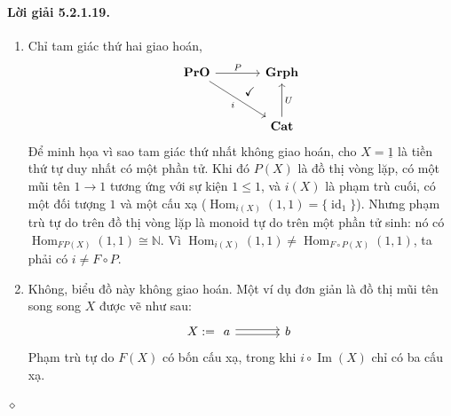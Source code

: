 \paragraph{Lời giải 5.2.1.19.}
\begin{enumerate}[label=\alph*.]
\item Chỉ tam giác thứ hai giao hoán,
\[\begin{tikzcd}[column sep=large,row sep=large]
\mathbf{PrO}\arrow[r,"P"]\arrow[dr,"i"']&\mathbf{Grph}\\&\mathbf{Cat}\arrow[u,"U"']\arrow[ul,phantom,"\checkmark"{xshift=10pt,yshift=6pt}]
\end{tikzcd}\]
Để minh họa vì sao tam giác thứ nhất không giao hoán, cho $X=\underline{1}$ là tiền thứ tự duy nhất có một phần tử. Khi đó $P(X)$ là đồ thị vòng lặp, có một mũi tên $1\to1$ tương ứng với sự kiện $1\leq1$, và $i(X)$ là phạm trù cuối, có một đối tượng $1$ và một cấu xạ ($\operatorname{Hom}_{i(X)}(1,1)=\{\operatorname{id}_1\}$). Nhưng phạm trù tự do trên đồ thị vòng lặp là monoid tự do trên một phần tử sinh: nó có $\operatorname{Hom}_{FP(X)}(1,1)\cong\mathbb N$. Vì $\operatorname{Hom}_{i(X)}(1,1)\ne\operatorname{Hom}_{F\circ P(X)}(1,1)$, ta phải có $i\ne F\circ P$.
\item Không, biểu đồ này không giao hoán. Một ví dụ đơn giản là đồ thị mũi tên song song $X$ được vẽ như sau:
\[X:=\begin{tikzcd}[column sep=large]a\arrow[r,shift left=2pt]\arrow[r,shift right=2pt]&b\end{tikzcd}\]
Phạm trù tự do $F(X)$ có bốn cấu xạ, trong khi $i\circ\operatorname{Im}(X)$ chỉ có ba cấu xạ.
\end{enumerate}\hfill$\diamond$
